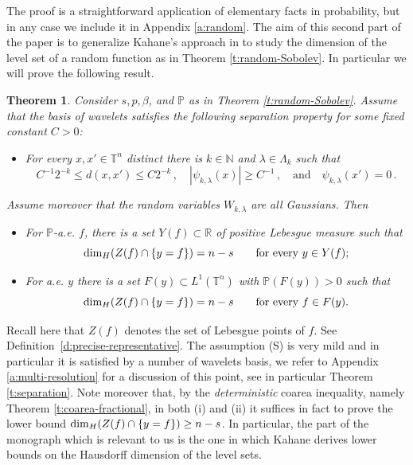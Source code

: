 \documentclass[11pt,reqno]{amsart}
\newtheorem{theorem}{Theorem}[section]
\theoremstyle{definition}
\numberwithin{equation}{section}
\begin{document}
The proof is a straightforward application of elementary facts in probability, but in any case we include it in Appendix \ref{a:random}.
The aim of this second part of the paper is to generalize Kahane's approach in \cite{Kahane} to study the dimension of the level set of a random function as in Theorem \ref{t:random-Sobolev}. In particular we will prove the following result. 

\begin{theorem}\label{t:random-level-sets}
Consider $s,p, \beta$, and $\mathbb P$ as in Theorem \ref{t:random-Sobolev}. Assume that the basis of wavelets satisfies the following separation property for some fixed constant $C>0$:
\begin{itemize}
    \item[(S)] For every $x,x'\in \mathbb T^n$ {\em distinct} there is $k\in \mathbb N$ and $\lambda \in \Lambda_k$ such that 
    \begin{equation}\label{e:separation}
    C^{-1} 2^{-k} \leq d (x,x') \leq C 2^{-k}\, , \quad |\psi_{k, \lambda} (x)|\geq C^{-1}\, , \quad \mbox{and} \quad \psi_{k,\lambda} (x')=0\, .
    \end{equation}
\end{itemize}
Assume moreover that the random variables $W_{k,\lambda}$ are all Gaussians. Then
\begin{itemize}
\item[(i)] For $\mathbb P$-a.e. $f$, there is a set $Y(f)\subset \mathbb R$ of positive Lebesgue measure such that 
\[
{\rm dim}_H (Z(f) \cap \{y=f\}) = n-s \qquad \mbox{for every $y\in Y(f)$;}
\]
\item[(ii)] For a.e. $y$ there is a set $F (y)\subset L^1 (\mathbb T^n)$ with $\mathbb P (F(y))>0$ such that 
\[
{\rm dim}_H (Z(f)\cap \{y=f\}) = n-s \qquad \mbox{for every $f\in F(y)$.}
\]
\end{itemize}
\end{theorem}

Recall here that $Z(f)$ denotes the set of Lebesgue points of $f$. See Definition~\ref{d:precise-representative}. The assumption (S) is very mild and in particular it is satisfied by a number of wavelets basis, we refer to Appendix \ref{a:multi-resolution} for a discussion of this point, see in particular Theorem \ref{t:separation}. Note moreover that, by the {\em deterministic} coarea inequality, namely Theorem \ref{t:coarea-fractional}, in both (i) and (ii) it suffices in fact to prove the lower bound ${\rm dim}_H (Z(f)\cap \{y=f\}) \geq n-s$. In particular, the part of the monograph \cite{Kahane} which is relevant to us is the one in which Kahane derives lower bounds on the Hausdorff dimension of the level sets. 
\end{document}
